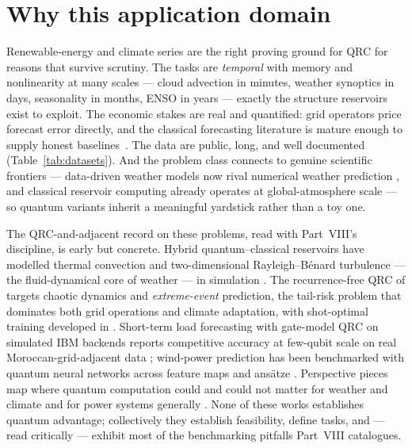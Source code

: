 
\section{Why this application domain}
\label{sec:why-energy}

Renewable-energy and climate series are the right proving ground for QRC for
reasons that survive scrutiny. The tasks are \emph{temporal} with memory and
nonlinearity at many scales --- cloud advection in minutes, weather synoptics
in days, seasonality in months, ENSO in years --- exactly the structure
reservoirs exist to exploit. The economic stakes are real and quantified:
grid operators price forecast error directly, and the classical forecasting
literature is mature enough to supply honest
baselines~\citep{inman2013solar,yang2018history,hong2016load,foley2012wind}.
The data are public, long, and well documented (Table~\ref{tab:datasets}).
And the problem class connects to genuine scientific frontiers --- data-driven
weather models now rival numerical weather prediction
\citep{rasp2020weatherbench,lam2023graphcast}, and classical reservoir
computing already operates at global-atmosphere scale
\citep{pathak2018model,arcomano2020machine} --- so quantum variants inherit a
meaningful yardstick rather than a toy one.

The QRC-and-adjacent record on these problems, read with Part~VIII's
discipline, is early but concrete. Hybrid quantum--classical reservoirs have
modelled thermal convection and two-dimensional Rayleigh--B\'enard turbulence
--- the fluid-dynamical core of weather --- in simulation
\citep{pfeffer2022hybrid,pfeffer2023reduced}. The recurrence-free QRC of
\citet{ahmed2024prediction} targets chaotic dynamics and \emph{extreme-event}
prediction, the tail-risk problem that dominates both grid operations and
climate adaptation, with shot-optimal training developed in
\citet{ahmed2025optimal}. Short-term load forecasting with gate-model QRC on
simulated IBM backends reports competitive accuracy at few-qubit scale on
real Moroccan-grid-adjacent data \citep{odo2026quantum}; wind-power
prediction has been benchmarked with quantum neural networks across feature
maps and ans\"atze \citep{hangun2025qnn,hangun2025comparative}. Perspective
pieces map where quantum computation could and could not matter for weather
and climate \citep{tennie2022quantum} and for power systems generally
\citep{ajagekar2019quantum,zhou2022quantum}. None of these works establishes
quantum advantage; collectively they establish feasibility, define tasks,
and --- read critically --- exhibit most of the benchmarking pitfalls Part~VIII
catalogues.

